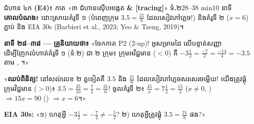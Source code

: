 \documentclass[a4paper,12pt]{article}
\newcommand{\en}[1]{{\TimesEn #1}}
\newcommand{\enbf}[1]{{\TimesEn\textbf{#1}}}
\newcommand{\cnum}[1]{\mbox{\TimesEn\fontsize{10.5pt}{12pt}\selectfont\ding{\numexpr181+#1\relax}}\hspace{0.15em}}
\begin{document}
\begin{phasebox}{ជំហាន ៤ក \enbf{(E4)}៖ កាត «៣ ជំហានស៊ើបអង្កេត \enbf{\& [tracing]}» ទំ\enbf{.}២}{28–38 min}{10 នាទី}
\textbf{គោលបំណង}៖ ដោះស្រាយគំរូទី ១ (បំពេញក្រុម $3.5=\frac{21}{6}$ ដែលសៀវភៅភ្លេច!) និងគំរូទី ២ ($x=6$) ភ្ជាប់ \en{[tracing]} និង \en{EIA 30s} \en{(Barbieri et al., 2023; Yeo \& Tzeng, 2019)}។
\end{phasebox}
\begin{scriptbox}
  \textbf{នាទី ២៨–៣៨ — គ្រូនិយាយថា៖} «ចែកកាត \en{P2 (2-up)}! អូសម្រាមដៃ \en{[tracing]} លើបន្ទាត់សញ្ញាដើម្បីញែកលំហាត់គំរូទី ១ (ទំ.២) ជា ២ ក្រុម៖ ក្រុមអវិជ្ជមាន ($<0$) គឺ $-3\frac{1}{2}=\frac{-7}{2}=\frac{-14}{4}=-3.5$ តាម \cnum{3}, \cnum{5}។»\par\vspace{2pt}
  «\textbf{ឈប់ពិនិត្យ!} នៅសល់លេខ ២ តួទៀតគឺ $3.5$ និង $\frac{21}{6}$ ដែលសៀវភៅភ្លេចសរសេរចម្លើយ! យើងត្រូវផ្គុំក្រុមវិជ្ជមាន ($>0$)៖ $3.5 = \frac{35}{10} = \frac{7}{2} = \frac{21}{6}$! ចូលគំរូទី ២៖ $\frac{45}{x} = 7\frac{1}{2} = \frac{15}{2}$ ($x\neq 0$, \cnum{1}) $\Rightarrow 15x = 90$ (\cnum{4}) $\Rightarrow x = 6$។»\par\vspace{2pt}
  \textbf{\en{EIA 30s}:} «១) ហេតុអ្វី $-3\frac{1}{2}=-\frac{7}{2}\neq -\frac{5}{2}$? \quad ២) ហេតុអ្វីត្រូវផ្គុំ $3.5=\frac{21}{6}$ ផង?»
\end{scriptbox}
\end{document}
